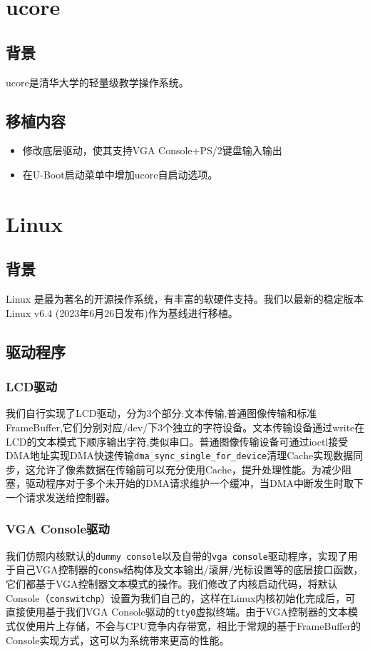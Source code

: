 \section{ucore}

\subsection{背景}
ucore是清华大学的轻量级教学操作系统。

\subsection{移植内容}
\begin{itemize}
    \item 修改底层驱动，使其支持VGA Console+PS/2键盘输入输出
    \item 在U-Boot启动菜单中增加ucore自启动选项。
\end{itemize}

\section{Linux}
\subsection{背景}
Linux 是最为著名的开源操作系统，有丰富的软硬件支持。我们以最新的稳定版本 Linux v6.4 (2023年6月26日发布)作为基线进行移植。

\subsection{驱动程序}

\subsubsection{LCD驱动}
我们自行实现了LCD驱动，分为3个部分:文本传输,普通图像传输和标准FrameBuffer,它们分别对应/dev/下3个独立的字符设备。文本传输设备通过write在LCD的文本模式下顺序输出字符,类似串口。普通图像传输设备可通过ioctl接受DMA地址实现DMA快速传输\texttt{dma\_sync\_single\_for\_device}清理Cache实现数据同步，这允许了像素数据在传输前可以充分使用Cache，提升处理性能。为减少阻塞，驱动程序对于多个未开始的DMA请求维护一个缓冲，当DMA中断发生时取下一个请求发送给控制器。

\subsubsection{VGA Console驱动}  
我们仿照内核默认的\verb|dummy console|以及自带的\verb|vga console|驱动程序，实现了用于自己VGA控制器的\verb|consw|结构体及文本输出/滚屏/光标设置等的底层接口函数，它们都基于VGA控制器文本模式的操作。我们修改了内核启动代码，将默认Console（\verb|conswitchp|）设置为我们自己的，这样在Linux内核初始化完成后，可直接使用基于我们VGA Console驱动的\verb|tty0|虚拟终端。由于VGA控制器的文本模式仅使用片上存储，不会与CPU竞争内存带宽，相比于常规的基于FrameBuffer的Console实现方式，这可以为系统带来更高的性能。

